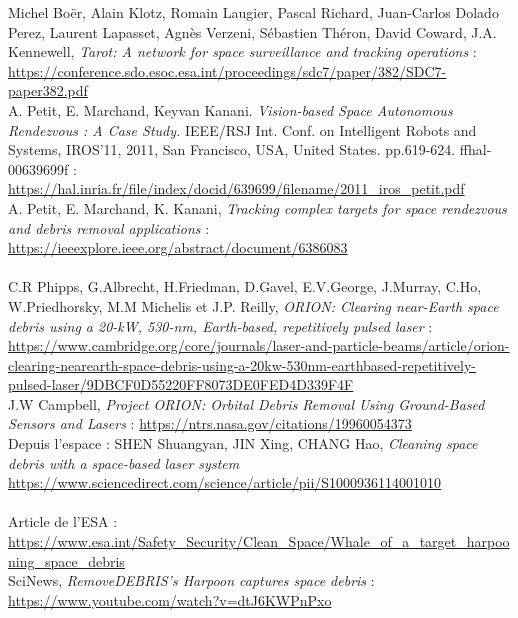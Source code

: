 \documentclass[a4paper,1pt]{article}
\begin{document}
\begin{thebibliography}{11}
		Michel Boër, Alain Klotz, Romain Laugier, Pascal Richard, Juan-Carlos Dolado Perez, Laurent
Lapasset, Agnès Verzeni, Sébastien Théron, David Coward, J.A. Kennewell, \textit{Tarot: A network for space surveillance and tracking operations} : \\
\url{https://conference.sdo.esoc.esa.int/proceedings/sdc7/paper/382/SDC7-paper382.pdf}\\
		
		A. Petit, E. Marchand, Keyvan Kanani. \textit{Vision-based Space Autonomous Rendezvous : A Case Study.}
IEEE/RSJ Int. Conf. on Intelligent Robots and Systems, IROS’11, 2011, San Francisco, USA, United
States. pp.619-624. ffhal-00639699f :
\url{https://hal.inria.fr/file/index/docid/639699/filename/2011_iros_petit.pdf}\\

	A. Petit, E. Marchand, K. Kanani, \textit{Tracking complex targets for space rendezvous and debris removal
applications} : \url{https://ieeexplore.ieee.org/abstract/document/6386083}\\


~\\
	C.R Phipps, G.Albrecht, H.Friedman, D.Gavel, E.V.George, J.Murray, C.Ho, 
	W.Priedhorsky, M.M Michelis et J.P. Reilly, \textit{ORION: Clearing near-Earth space debris using a 20-kW, 530-nm, Earth-based, repetitively pulsed laser} :\\
	\url{https://www.cambridge.org/core/journals/laser-and-particle-beams/article/orion-clearing-nearearth-space-debris-using-a-20kw-530nm-earthbased-repetitively-pulsed-laser/9DBCF0D55220FF8073DE0FED4D339F4F}\\
	
	J.W Campbell, \textit{Project ORION: Orbital Debris Removal Using Ground-Based Sensors and Lasers} : 
	\url{https://ntrs.nasa.gov/citations/19960054373}\\
	
	Depuis l'espace : SHEN Shuangyan, JIN Xing, CHANG Hao, \textit{Cleaning space debris with a space-based laser system}\\
	\url{https://www.sciencedirect.com/science/article/pii/S1000936114001010}\\
	

~\\
		Article de l'ESA : \url{https://www.esa.int/Safety_Security/Clean_Space/Whale_of_a_target_harpooning_space_debris}\\
		
		SciNews, \textit{RemoveDEBRIS’s Harpoon captures space debris} :\\
		\url{https://www.youtube.com/watch?v=dtJ6KWPnPxo}\\
	

\end{thebibliography}
\end{document}
